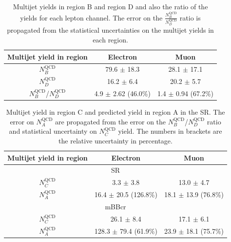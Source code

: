 \begin{table}
\begin{center}
\begin{tabular}{c|c|c}
Multijet yield in region              & Electron                & Muon   \\      
\hline
$N_B^\text{QCD}$                      & 79.6 $\pm$ 18.3      & 28.1 $\pm$ 17.1 \\
$N_D^\text{QCD}$                      & 16.2 $\pm$ 6.4      & 20.2 $\pm$ 5.7  \\
\hline
$N_{B}^\text{QCD}$/$N_{D}^\text{QCD}$     & 4.9 $\pm$ 2.62 (46.0\%) & 1.4 $\pm$ 0.94 (67.2\%)   \\
\end{tabular}
\end{center}
\caption[Multijet yields in region B and region D and also the ratio of the yields for each lepton channel]{Multijet yields in region B and region D and also the ratio of the yields for each lepton channel. The error
on the $\frac{N_B^\text{QCD}}{N_D^\text{QCD}}$ ratio is propagated from the statistical uncertainties on the multijet yields in each region.}
\label{tab:boosted_bkgd_abcd_ratio_new}
\end{table}

\begin{table}[!htbp]
\begin{center}
\begin{tabular}{c|c|c}
Multijet yield in region & Electron  & Muon  \\  
\hline
\multicolumn{3}{c}{SR} \\
\hline
$N_C^\text{QCD}$         & 3.3  $\pm$ 3.8 & 13.0 $\pm$ 4.7 \\
$N_A^\text{QCD}$         & 16.4 $\pm$ 20.5 (126.8\%) & 18.1 $\pm$ 13.9 (76.8\%) \\
\hline
\multicolumn{3}{c}{mBBcr} \\
\hline
$N_C^\text{QCD}$       & 26.1  $\pm$ 8.4 & 17.1  $\pm$ 6.1  \\
$N_A^\text{QCD}$       & 128.3 $\pm$ 79.4 (61.9\%) & 23.9 $\pm$ 18.1 (75.7\%)  \\
\hline
\end{tabular}
\end{center}
\caption[Multijet yield in region C and predicted yield in region A in the SR]{Multijet yield in region C and predicted yield in region A in the SR. The error on $N_A^\text{QCD}$
are propagated from the error on the $N_B^\text{QCD}$/$N_D^\text{QCD}$ ratio and statistical uncertainty on $N_C^\text{QCD}$ yield.
The numbers in brackets are the relative uncertainty in percentage.}
\label{tab:boosted_bkgd_abcd_yield_new}
\end{table}


